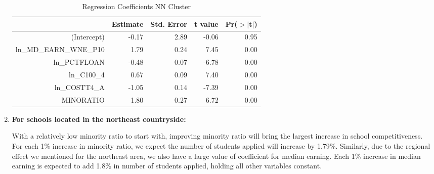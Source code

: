 \documentclass{article}
\begin{document}
\begin{enumerate}
\begin{table}[H]
\centering
\begin{tabular}{rrrrr}
  \hline
 & Estimate & Std. Error & t value & Pr($>$$|$t$|$) \\ 
  \hline
(Intercept) & -0.17 & 2.89 & -0.06 & 0.95 \\ 
  ln\_MD\_EARN\_WNE\_P10 & 1.79 & 0.24 & 7.45 & 0.00 \\ 
  ln\_PCTFLOAN & -0.48 & 0.07 & -6.78 & 0.00 \\ 
  ln\_C100\_4 & 0.67 & 0.09 & 7.40 & 0.00 \\ 
  ln\_COSTT4\_A & -1.05 & 0.14 & -7.39 & 0.00 \\ 
  MINORATIO & 1.80 & 0.27 & 6.72 & 0.00 \\ 
   \hline
\end{tabular}
\caption{Regression Coefficients NN Cluster} 
\end{table}  
\item\textbf{ For schools located in the northeast countryside:}
  
With a relatively low minority ratio to start with, improving minority ratio will bring the largest increase in school competitiveness. For each 1\% increase in minority ratio, we expect the number of students applied will increase by 1.79\%. Similarly, due to the regional effect we mentioned for the northeast area, we also have a large value of coefficient for median earning. Each 1\% increase in median earning is expected to add 1.8\% in number of students applied, holding all other variables constant.\\


\end{enumerate}
\end{document}
